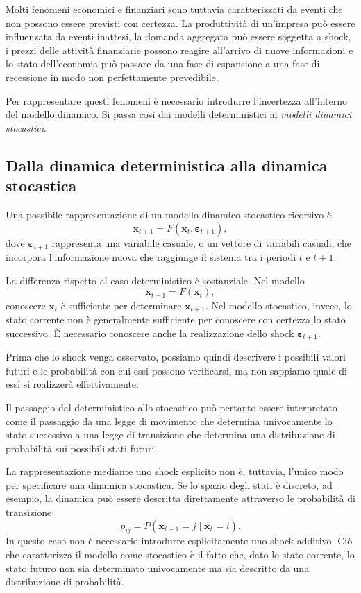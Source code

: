 \documentclass{book}
\begin{document}
Molti fenomeni economici e finanziari sono tuttavia caratterizzati da eventi che non possono essere previsti con certezza. La produttività di un'impresa può essere influenzata da eventi inattesi, la domanda aggregata può essere soggetta a shock, i prezzi delle attività finanziarie possono reagire all'arrivo di nuove informazioni e lo stato dell'economia può passare da una fase di espansione a una fase di recessione in modo non perfettamente prevedibile.

Per rappresentare questi fenomeni è necessario introdurre l'incertezza all'interno del modello dinamico. Si passa così dai modelli deterministici ai \emph{modelli dinamici stocastici}.

\subsection{Dalla dinamica deterministica alla dinamica stocastica}

Una possibile rappresentazione di un modello dinamico stocastico ricorsivo è
\[
\mathbf{x}_{t+1}
=
F(\mathbf{x}_t,\boldsymbol{\varepsilon}_{t+1}),
\]
dove $\boldsymbol{\varepsilon}_{t+1}$ rappresenta una variabile casuale, o un vettore di variabili casuali, che incorpora l'informazione nuova che raggiunge il sistema tra i periodi $t$ e $t+1$.

La differenza rispetto al caso deterministico è sostanziale. Nel modello
\[
\mathbf{x}_{t+1}=F(\mathbf{x}_t),
\]
conoscere $\mathbf{x}_t$ è sufficiente per determinare $\mathbf{x}_{t+1}$. Nel modello stocastico, invece, lo stato corrente non è generalmente sufficiente per conoscere con certezza lo stato successivo. È necessario conoscere anche la realizzazione dello shock $\boldsymbol{\varepsilon}_{t+1}$.

Prima che lo shock venga osservato, possiamo quindi descrivere i possibili valori futuri e le probabilità con cui essi possono verificarsi, ma non sappiamo quale di essi si realizzerà effettivamente.

Il passaggio dal deterministico allo stocastico può pertanto essere interpretato come il passaggio da una legge di movimento che determina univocamente lo stato successivo a una legge di transizione che determina una distribuzione di probabilità sui possibili stati futuri.

La rappresentazione mediante uno shock esplicito non è, tuttavia, l'unico modo per specificare una dinamica stocastica. Se lo spazio degli stati è discreto, ad esempio, la dinamica può essere descritta direttamente attraverso le probabilità di transizione
\[
p_{ij}
=
P(\mathbf{x}_{t+1}=j\mid\mathbf{x}_t=i).
\]
In questo caso non è necessario introdurre esplicitamente uno shock additivo. Ciò che caratterizza il modello come stocastico è il fatto che, dato lo stato corrente, lo stato futuro non sia determinato univocamente ma sia descritto da una distribuzione di probabilità.
\end{document}
